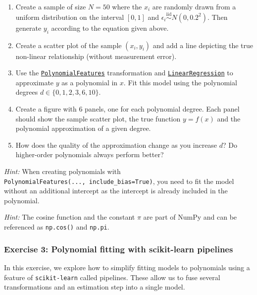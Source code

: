 \documentclass{scrartcl}
\providecommand{\tightlist}{%
      \setlength{\itemsep}{0pt}\setlength{\parskip}{0pt}}
\begin{document}
\begin{enumerate}
\def\labelenumi{\arabic{enumi}.}
\tightlist
\item
  Create a sample of size \(N=50\) where the \(x_i\) are randomly drawn
  from a uniform distribution on the interval \([0, 1]\) and
  \(\epsilon_i \stackrel{\text{iid}}{\sim} N(0, 0.2^2)\). Then generate
  \(y_i\) according to the equation given above.
\item
  Create a scatter plot of the sample \((x_i, y_i)\) and add a line
  depicting the true non-linear relationship (without measurement
  error).
\item
  Use the
  \href{https://scikit-learn.org/stable/modules/generated/sklearn.preprocessing.PolynomialFeatures.html}{\texttt{PolynomialFeatures}}
  transformation and
  \href{https://scikit-learn.org/stable/modules/generated/sklearn.linear_model.LinearRegression.html}{\texttt{LinearRegression}}
  to approximate \(y\) as a polynomial in \(x\). Fit this model using
  the polynomial degrees \(d \in \{0, 1, 2, 3, 6, 10\}\).
\item
  Create a figure with 6 panels, one for each polynomial degree. Each
  panel should show the sample scatter plot, the true function
  \(y = f(x)\) and the polynomial approximation of a given degree.
\item
  How does the quality of the approximation change as you increase
  \(d\)? Do higher-order polynomials always perform better?
\end{enumerate}

\emph{Hint:} When creating polynomials with
\texttt{PolynomialFeatures(...,\ include\_bias=True)}, you need to fit
the model without an additional intercept as the intercept is already
included in the polynomial.

\emph{Hint:} The cosine function and the constant \(\pi\) are part of
NumPy and can be referenced as \texttt{np.cos()} and \texttt{np.pi}.

    \hypertarget{exercise-3-polynomial-fitting-with-scikit-learn-pipelines}{%
\subsubsection{Exercise 3: Polynomial fitting with scikit-learn
pipelines}\label{exercise-3-polynomial-fitting-with-scikit-learn-pipelines}}

In this exercise, we explore how to simplify fitting models to
polynomials using a feature of \texttt{scikit-learn} called pipelines.
These allow us to fuse several transformations and an estimation step
into a single model.
\end{document}
